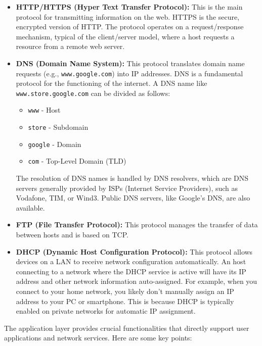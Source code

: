 \begin{itemize}
    \item \textbf{HTTP/HTTPS (Hyper Text Transfer Protocol):} This is the main protocol for transmitting information on the web. HTTPS is the secure, encrypted version of HTTP. The protocol operates on a request/response mechanism, typical of the client/server model, where a host requests a resource from a remote web server.

    \item \textbf{DNS (Domain Name System):} This protocol translates domain name requests (e.g., \texttt{www.google.com}) into IP addresses. DNS is a fundamental protocol for the functioning of the internet. A DNS name like \texttt{www.store.google.com} can be divided as follows:
    \begin{itemize}
        \item \texttt{www} - Host
        \item \texttt{store} - Subdomain
        \item \texttt{google} - Domain
        \item \texttt{com} - Top-Level Domain (TLD)
    \end{itemize}
    The resolution of DNS names is handled by DNS resolvers, which are DNS servers generally provided by ISPs (Internet Service Providers), such as Vodafone, TIM, or Wind3. Public DNS servers, like Google's DNS, are also available.

    \item \textbf{FTP (File Transfer Protocol):} This protocol manages the transfer of data between hosts and is based on TCP.

    \item \textbf{DHCP (Dynamic Host Configuration Protocol):} This protocol allows devices on a LAN to receive network configuration automatically. An host connecting to a network where the DHCP service is active will have its IP address and other network information auto-assigned. For example, when you connect to your home network, you likely don't manually assign an IP address to your PC or smartphone. This is because DHCP is typically enabled on private networks for automatic IP assignment.
\end{itemize}

The application layer provides crucial functionalities that directly support user applications and network services. Here are some key points:

